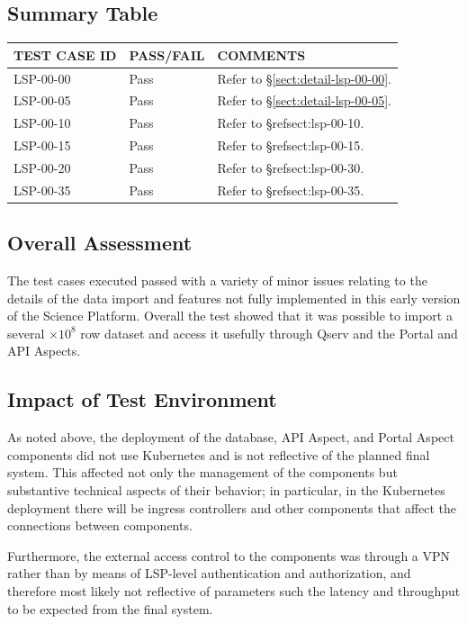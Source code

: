 \documentclass[DM,lsstdraft,STR,toc]{lsstdoc}
\begin{document}
\subsection{Summary Table}
\label{sect:summarytable}

\begin{longtable} {|p{}|p{}|p{}|}\hline
{\bf TEST CASE ID} & {\bf PASS/FAIL} & {\bf COMMENTS} \\\hline
LSP-00-00 & Pass & Refer to \S\ref{sect:detail-lsp-00-00}. \\\hline
LSP-00-05 & Pass & Refer to \S\ref{sect:detail-lsp-00-05}. \\\hline
LSP-00-10 & Pass & Refer to \S ref{sect:lsp-00-10}. \\\hline
LSP-00-15 & Pass & Refer to \S ref{sect:lsp-00-15}. \\\hline
LSP-00-20 & Pass & Refer to \S ref{sect:lsp-00-30}. \\\hline
LSP-00-35 & Pass & Refer to \S ref{sect:lsp-00-35}. \\\hline
\end{longtable}

\subsection{Overall Assessment}
\label{sect:overallassessment}

The test cases executed passed with a variety of minor issues relating to the details of the data import and features not fully implemented in this early version of the Science Platform.
Overall the test showed that it was possible to import a several $\times 10^8$ row dataset and access it usefully through Qserv and the Portal and API Aspects.

\subsection{Impact of Test Environment}
\label{sect:impact}

As noted above, the deployment of the database, API Aspect, and Portal Aspect components did not use Kubernetes and is not reflective of the planned final system.
This affected not only the management of the components but substantive technical aspects of their behavior;
in particular, in the Kubernetes deployment there will be ingress controllers and other components that affect the connections between components.

Furthermore, the external access control to the components was through a VPN rather than by means of LSP-level authentication and authorization,
and therefore most likely not reflective of parameters such the latency and throughput to be expected from the final system.
\end{document}
